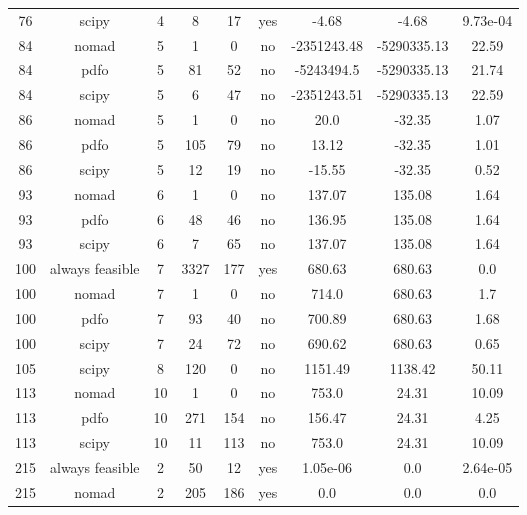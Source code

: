 \begin{scriptsize}
\begin{center}
\begin{longtable}{ccccccccc}
 76 &           scipy &  4 &      8 &     17 &     yes &       -4.68 &       -4.68 & 9.73e-04\\
 84 &           nomad &  5 &      1 &      0 &      no & -2351243.48 & -5290335.13 &    22.59\\
 84 &            pdfo &  5 &     81 &     52 &      no &  -5243494.5 & -5290335.13 &    21.74\\
 84 &           scipy &  5 &      6 &     47 &      no & -2351243.51 & -5290335.13 &    22.59\\
 86 &           nomad &  5 &      1 &      0 &      no &        20.0 &      -32.35 &     1.07\\
 86 &            pdfo &  5 &    105 &     79 &      no &       13.12 &      -32.35 &     1.01\\
 86 &           scipy &  5 &     12 &     19 &      no &      -15.55 &      -32.35 &     0.52\\
 93 &           nomad &  6 &      1 &      0 &      no &      137.07 &      135.08 &     1.64\\
 93 &            pdfo &  6 &     48 &     46 &      no &      136.95 &      135.08 &     1.64\\
 93 &           scipy &  6 &      7 &     65 &      no &      137.07 &      135.08 &     1.64\\
100 & always feasible &  7 &   3327 &    177 &     yes &      680.63 &      680.63 &      0.0\\
100 &           nomad &  7 &      1 &      0 &      no &       714.0 &      680.63 &      1.7\\
100 &            pdfo &  7 &     93 &     40 &      no &      700.89 &      680.63 &     1.68\\
100 &           scipy &  7 &     24 &     72 &      no &      690.62 &      680.63 &     0.65\\
105 &           scipy &  8 &    120 &      0 &      no &     1151.49 &     1138.42 &    50.11\\
113 &           nomad & 10 &      1 &      0 &      no &       753.0 &       24.31 &    10.09\\
113 &            pdfo & 10 &    271 &    154 &      no &      156.47 &       24.31 &     4.25\\
113 &           scipy & 10 &     11 &    113 &      no &       753.0 &       24.31 &    10.09\\
215 & always feasible &  2 &     50 &     12 &     yes &    1.05e-06 &         0.0 & 2.64e-05\\
215 &           nomad &  2 &    205 &    186 &     yes &         0.0 &         0.0 &      0.0\\

\end{longtable}
\end{center}
\end{scriptsize}
